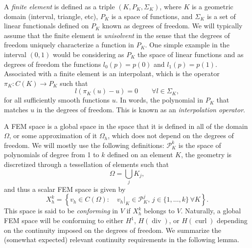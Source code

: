\documentclass{article}
\DeclareMathOperator{\dive}{\text{div}}
\DeclareMathOperator{\curl}{\text{curl}}
\renewcommand{\P}{\mathcal{P}}
\begin{document}
A \emph{finite element} is defined as a triple $(K, P_K, \Sigma_K)$, where $K$ is a geometric domain (interval, triangle, etc), $P_K$ is a space of functions, and $\Sigma_K$ is a set of linear functionals defined on $P_K$ known as degrees of freedom. We will typically assume that the finite element is \emph{unisolvent} in the sense that the degrees of freedom uniquely characterize a function in $P_K$. One simple example in the interval $(0,1)$ would be considering as $P_K$ the space of linear functions and as degrees of freedom the functions $l_0(p) = p(0)$ and $l_1(p) = p(1)$. Associated with a finite element is an interpolant, which is the operator $\pi_K: C(K) \to P_K$ such that 
    $$ l( \pi_K(u) - u) = 0 \qquad\forall l \in \Sigma_K,$$
for all sufficiently smooth functions $u$. In words, the polynomial in $P_K$ that matches $u$ in the degrees of freedom. This is known as an \emph{interpolation operator}. 

A FEM space is a global space in the space that it is defined in all of the domain $\Omega$, or some approximation of it $\Omega_h$, which does not depend on the degrees of freedom. We will mostly use the following definitions: $\P^k_K$ is the space of polynomials of degree from 1 to $k$ defined on an element $K$, the geometry is discretized through a tessellation of elements such that
    $$ \Omega = \bigcup_j K_j, $$
and thus a scalar FEM space is given by
    $$ X_h^k = \left\{ v_h \in C(\Omega): \quad v_h|_K \in \P_K^j, \,j\in\{1,\hdots,k\} \,\forall K \right\}. $$
This space is said to be \emph{conforming} in $V$ if $X_h^k$ belongs to $V$. Naturally, a global FEM space will be conforming to either $H^1$, $H(\dive)$, or $H(\curl)$ depending on the continuity imposed on the degrees of freedom. We summarize the (somewhat expected) relevant continuity requirements in the following lemma. 
\end{document}
